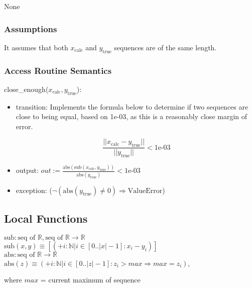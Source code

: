 \documentclass[12pt]{article}
\begin{document}
\begin{enumerate}[a)]
None

\subsubsection* {Assumptions}

It assumes that both $x_\text{calc}$ and $y_\text{true}$ sequences are of the same length. 

\subsubsection* {Access Routine Semantics}

\noindent close\_enough($x_\text{calc}, y_\text{true}$):
\begin{itemize}
\item transition: Implements the formula below to determine if two sequences are close to being equal, based on \text1e-03, as this is a reasonably close margin of error. 

\begin{equation}
\frac{|| x_\text{calc} - y_\text{true} ||} {||y_\text{true}||} < \text{1e-03} \label{Eq_calcError}
\end{equation} 

\item output: $out := \frac{\text{abs}(\text{sub}(x_\text{calc}, y_\text{true}))} {\text{abs}(y_\text{true})} < \text{1e-03}$
\item exception: ($\neg (\text{abs}(y_\text{true}) \neq 0) \Rightarrow \text{ValueError}$)
\end{itemize}

\subsection*{Local Functions}

\noindent $\text{sub}: \text{seq of } \mathbb{R}, \text{seq of } \mathbb{R} \rightarrow \mathbb{R}$\\
\noindent $\text{sub}(x, y) \equiv [(+ i: \mathbb{N} | i \in [0..|x|-1] :
x_i - y_i)]$\\

\noindent $\text{abs}: \text{seq of } \mathbb{R} \rightarrow \mathbb{R}$\\
\noindent $\text{abs}(z) \equiv (+ i: \mathbb{N} | i \in [0..|z|-1] :
z_i > max \Rightarrow max = z_i)$,

where $max$ = current maximum of sequence


\end{enumerate}
\end{document}
